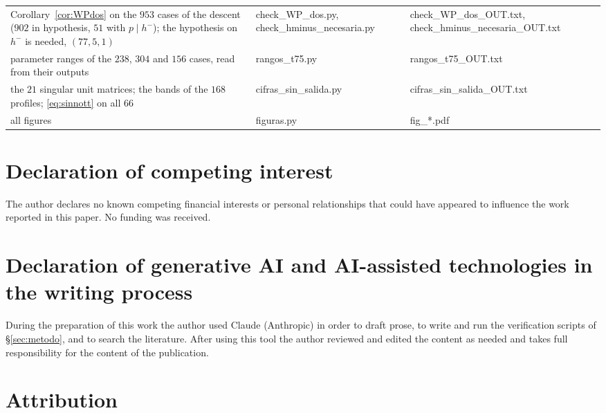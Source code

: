 \documentclass[11pt,a4paper]{article}
\theoremstyle{definition}
\begin{document}
\begin{center}
\begin{tabular}{p{}p{}p{}}
Corollary~\ref{cor:WPdos} on the $953$ cases of the descent ($902$ in hypothesis, $51$ with $p\mid h^-$); the hypothesis on $h^-$ is needed, $(77,5,1)$ & {\ttfamily\footnotesize check\_WP\_dos.py, check\_hminus\_necesaria.py} & {\ttfamily\footnotesize check\_WP\_dos\_OUT.txt, \allowbreak check\_hminus\_necesaria\_OUT.txt} \\
parameter ranges of the $238$, $304$ and $156$ cases, read from their outputs & {\ttfamily\footnotesize rangos\_t75.py} & {\ttfamily\footnotesize rangos\_t75\_OUT.txt} \\
the $21$ singular unit matrices; the bands of the $168$ profiles; \eqref{eq:sinnott} on all $66$ & {\ttfamily\footnotesize cifras\_sin\_salida.py} & {\ttfamily\footnotesize cifras\_sin\_salida\_OUT.txt} \\
all figures & {\ttfamily\footnotesize figuras.py} & {\ttfamily\footnotesize fig\_*.pdf} \\
\bottomrule
\end{tabular}
\end{center}


\section*{Declaration of competing interest}

\noindent The author declares no known competing financial interests or personal relationships that
could have appeared to influence the work reported in this paper. No funding was received.

\section*{Declaration of generative AI and AI-assisted technologies in the writing process}

\noindent During the preparation of this work the author used Claude (Anthropic) in order to draft
prose, to write and run the verification scripts of \S\ref{sec:metodo}, and to search the
literature. After using this tool the author reviewed and edited the content as needed and takes
full responsibility for the content of the publication.

\section*{Attribution}
\end{document}
